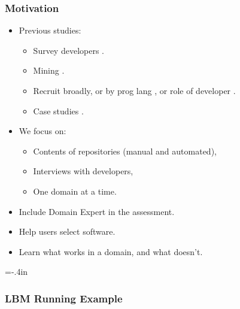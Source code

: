 \documentclass[usenames,dvipsnames]{beamer}
\begin{document}
\begin{frame}

\frametitle{Motivation}

\begin{itemize}
\item Previous studies:
\begin{itemize}
\item Survey developers \citep{HannayEtAl2009, Nguyen-HoanEtAl2010,
PintoEtAl2018}.
\item Mining \citep{GrannanEtAl2020, SoodEtAl2019}.
\item Recruit broadly, or by prog lang \citep{PintoEtAl2018}, or role of developer \citep{UditAndKatz2017}.
\item Case studies \citep{CarverEtAl2007,Segal2005}.
\end{itemize}
\item We focus on:
\begin{itemize}
  \item Contents of repositories (manual and automated),
  \item Interviews with developers,
  \item One domain at a time.
\end{itemize}
\item Include Domain Expert in the assessment.
\item Help users select software.
\item Learn what works in a domain, and what doesn't.
\end{itemize}

\end{frame}


\hoffset=-.4in %
\begin{frame}[plain]

\frametitle{LBM Running Example}

  
\end{frame}
\hoffset=0in %
\end{document}
